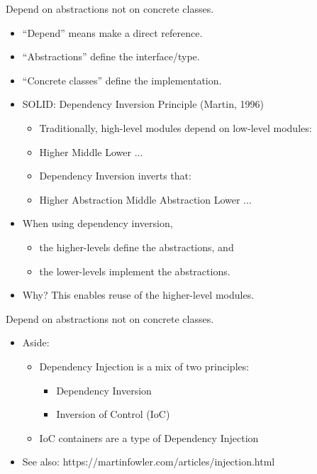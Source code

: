 \documentclass{beamer}
\begin{document}
\begin{frame}{Depend on abstractions not on concrete classes.}
    \begin{itemize}
        \item ``Depend'' means make a direct reference.
        \item ``Abstractions'' define the interface/type.
        \item ``Concrete classes'' define the implementation.
        \item SOLID: Dependency Inversion Principle (Martin, 1996)
        \begin{itemize}
            \item Traditionally, high-level modules depend on low-level modules:
            \item Higher \textrightarrow{} Middle \textrightarrow{} Lower \textrightarrow{} ...
            \item Dependency Inversion inverts that:
            \item Higher \textrightarrow{} Abstraction \textleftarrow{} Middle \textrightarrow{} Abstraction \textleftarrow{} Lower ...
        \end{itemize}
        \item When using dependency inversion, 
        \begin{itemize}
            \item the higher-levels define the abstractions, and
            \item the lower-levels implement the abstractions.
        \end{itemize}
        \item Why? This enables reuse of the higher-level modules.
    \end{itemize}
\end{frame}

\begin{frame}{Depend on abstractions not on concrete classes.}
    \begin{itemize}
    \item Aside:
        \begin{itemize}
            \item Dependency Injection is a mix of two principles:
                \begin{itemize}
                    \item Dependency Inversion
                    \item Inversion of Control (IoC)
                \end{itemize}
            \item IoC containers are a type of Dependency Injection
        \end{itemize}
        \item See also: https://martinfowler.com/articles/injection.html
    \end{itemize}
\end{frame}
\end{document}

